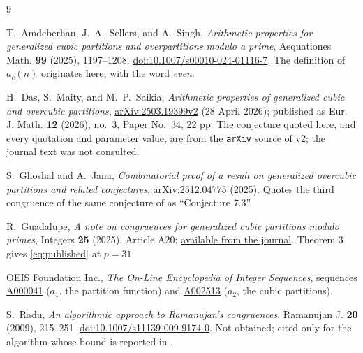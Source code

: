 \documentclass[11pt]{amsart}
\theoremstyle{remark}
\begin{document}
\begin{thebibliography}{9}

T.~Amdeberhan, J.~A.~Sellers, and A.~Singh,
\emph{Arithmetic properties for generalized cubic partitions and
overpartitions modulo a prime},
Aequationes Math. \textbf{99} (2025), 1197--1208.
\href{https://doi.org/10.1007/s00010-024-01116-7}{doi:10.1007/s00010-024-01116-7}.
The definition of $a_c(n)$ originates here, with the word \emph{even}.

H.~Das, S.~Maity, and M.~P.~Saikia,
\emph{Arithmetic properties of generalized cubic and overcubic partitions},
\href{https://arxiv.org/abs/2503.19399}{arXiv:2503.19399v2} (28 April 2026);
published as Eur. J. Math. \textbf{12} (2026), no.~3, Paper No.~34, 22 pp.
The conjecture quoted here, and every quotation and parameter value, are from
the \texttt{arXiv} source of v2; the journal text was not consulted.

S.~Ghoshal and A.~Jana,
\emph{Combinatorial proof of a result on generalized overcubic partitions and
related conjectures},
\href{https://arxiv.org/abs/2512.04775}{arXiv:2512.04775} (2025).
Quotes the third congruence of the same conjecture of \cite{DasMaitySaikia} as
``Conjecture 7.3''.

R.~Guadalupe,
\emph{A note on congruences for generalized cubic partitions modulo primes},
Integers \textbf{25} (2025), Article A20;
\href{https://math.colgate.edu/~integers/z20/z20.pdf}{available from the journal}.
Theorem 3 gives \eqref{eq:published} at $p=31$.

OEIS Foundation Inc.,
\emph{The On-Line Encyclopedia of Integer Sequences},
sequences \href{https://oeis.org/A000041}{A000041} ($a_1$, the partition
function) and \href{https://oeis.org/A002513}{A002513} ($a_2$, the cubic
partitions).

S.~Radu,
\emph{An algorithmic approach to Ramanujan's congruences},
Ramanujan J. \textbf{20} (2009), 215--251.
\href{https://doi.org/10.1007/s11139-009-9174-0}{doi:10.1007/s11139-009-9174-0}.
Not obtained; cited only for the algorithm whose bound is reported in
\cite{DasMaitySaikia}.

\end{thebibliography}
\end{document}
